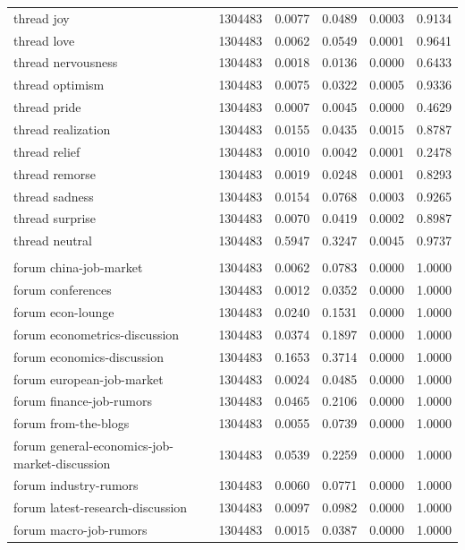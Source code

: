 \documentclass[11pt]{article}
\begin{document}
\begin{center}
\begin{longtable}{lrrrrr}
thread joy & 1304483 & 0.0077 & 0.0489 & 0.0003 & 0.9134 \\
thread love & 1304483 & 0.0062 & 0.0549 & 0.0001 & 0.9641 \\
thread nervousness & 1304483 & 0.0018 & 0.0136 & 0.0000 & 0.6433 \\
thread optimism & 1304483 & 0.0075 & 0.0322 & 0.0005 & 0.9336 \\
thread pride & 1304483 & 0.0007 & 0.0045 & 0.0000 & 0.4629 \\
thread realization & 1304483 & 0.0155 & 0.0435 & 0.0015 & 0.8787 \\
thread relief & 1304483 & 0.0010 & 0.0042 & 0.0001 & 0.2478 \\
thread remorse & 1304483 & 0.0019 & 0.0248 & 0.0001 & 0.8293 \\
thread sadness & 1304483 & 0.0154 & 0.0768 & 0.0003 & 0.9265 \\
thread surprise & 1304483 & 0.0070 & 0.0419 & 0.0002 & 0.8987 \\
thread neutral & 1304483 & 0.5947 & 0.3247 & 0.0045 & 0.9737 \\
\addlinespace
\multicolumn{6}{l}{\textit{Forum indicators}} \\
forum china-job-market & 1304483 & 0.0062 & 0.0783 & 0.0000 & 1.0000 \\
forum conferences & 1304483 & 0.0012 & 0.0352 & 0.0000 & 1.0000 \\
forum econ-lounge & 1304483 & 0.0240 & 0.1531 & 0.0000 & 1.0000 \\
forum econometrics-discussion & 1304483 & 0.0374 & 0.1897 & 0.0000 & 1.0000 \\
forum economics-discussion & 1304483 & 0.1653 & 0.3714 & 0.0000 & 1.0000 \\
forum european-job-market & 1304483 & 0.0024 & 0.0485 & 0.0000 & 1.0000 \\
forum finance-job-rumors & 1304483 & 0.0465 & 0.2106 & 0.0000 & 1.0000 \\
forum from-the-blogs & 1304483 & 0.0055 & 0.0739 & 0.0000 & 1.0000 \\
forum general-economics-job-market-discussion & 1304483 & 0.0539 & 0.2259 & 0.0000 & 1.0000 \\
forum industry-rumors & 1304483 & 0.0060 & 0.0771 & 0.0000 & 1.0000 \\
forum latest-research-discussion & 1304483 & 0.0097 & 0.0982 & 0.0000 & 1.0000 \\
forum macro-job-rumors & 1304483 & 0.0015 & 0.0387 & 0.0000 & 1.0000 \\

\end{longtable}
\end{center}
\end{document}
